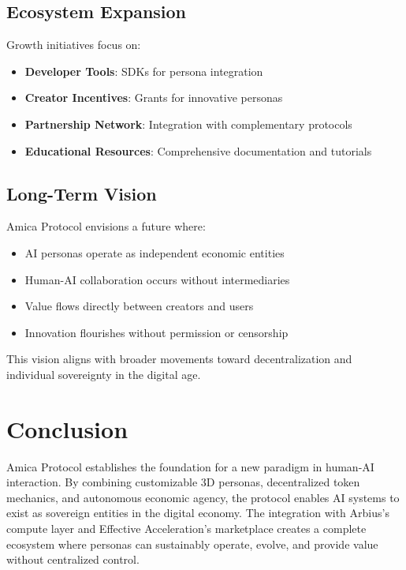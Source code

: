 \documentclass{article}
\begin{document}
\subsection{Ecosystem Expansion}

Growth initiatives focus on:

\begin{itemize}
    \item \textbf{Developer Tools}: SDKs for persona integration
    \item \textbf{Creator Incentives}: Grants for innovative personas
    \item \textbf{Partnership Network}: Integration with complementary protocols
    \item \textbf{Educational Resources}: Comprehensive documentation and tutorials
\end{itemize}

\subsection{Long-Term Vision}

Amica Protocol envisions a future where:

\begin{itemize}
    \item AI personas operate as independent economic entities
    \item Human-AI collaboration occurs without intermediaries
    \item Value flows directly between creators and users
    \item Innovation flourishes without permission or censorship
\end{itemize}

This vision aligns with broader movements toward decentralization and individual sovereignty in the digital age.

\section{Conclusion}

Amica Protocol establishes the foundation for a new paradigm in human-AI interaction. By combining customizable 3D personas, decentralized token mechanics, and autonomous economic agency, the protocol enables AI systems to exist as sovereign entities in the digital economy. The integration with Arbius's compute layer and Effective Acceleration's marketplace creates a complete ecosystem where personas can sustainably operate, evolve, and provide value without centralized control.
\end{document}
